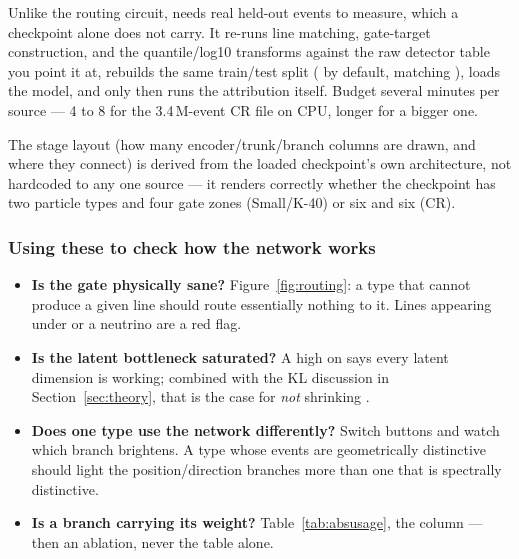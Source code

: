 \documentclass[11pt,a4paper]{article}
\begin{document}
\begin{magiwarn}
Unlike the routing circuit,  needs real held-out
events to measure, which a checkpoint alone does not carry. It re-runs line
matching, gate-target construction, and the quantile/log10 transforms against
the raw detector table you point it at, rebuilds the same train/test split
( by default, matching
), loads the model, and only then runs the
attribution itself. Budget several minutes per source --- 4 to 8 for the
3.4\,M-event CR file on CPU, longer for a bigger one.
\end{magiwarn}

The stage layout (how many encoder/trunk/branch columns are drawn, and where
they connect) is derived from the loaded checkpoint's own architecture, not
hardcoded to any one source --- it renders correctly whether the checkpoint
has two particle types and four gate zones (Small/K-40) or six and six (CR).

\subsubsection*{Using these to check how the network works}

\begin{itemize}[nosep]
  \item \textbf{Is the gate physically sane?} Figure~\ref{fig:routing}: a type
    that cannot produce a given line should route essentially nothing to it.
    Lines appearing under  or a neutrino are a red flag.
  \item \textbf{Is the latent bottleneck saturated?} A high  on
     says every latent dimension is working; combined with the KL
    discussion in Section~\ref{sec:theory}, that is the case for
    \emph{not} shrinking .
  \item \textbf{Does one type use the network differently?} Switch buttons and
    watch which branch brightens. A type whose events are geometrically
    distinctive should light the position/direction branches more than one that
    is spectrally distinctive.
  \item \textbf{Is a branch carrying its weight?} Table~\ref{tab:absusage}, the
     column --- then an ablation, never the table alone.
\end{itemize}

\end{document}
